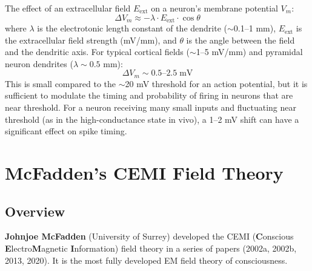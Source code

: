 \documentclass[11pt,a4paper]{report}
\begin{document}
\begin{mathbox}
\vspace{-6pt}
The effect of an extracellular field $E_{\text{ext}}$ on a neuron's membrane potential $V_m$:
\[
  \Delta V_m \approx -\lambda \cdot E_{\text{ext}} \cdot \cos\theta
\]
where $\lambda$ is the electrotonic length constant of the dendrite ($\sim$0.1--1 mm), $E_{\text{ext}}$ is the extracellular field strength (mV/mm), and $\theta$ is the angle between the field and the dendritic axis. For typical cortical fields ($\sim$1--5 mV/mm) and pyramidal neuron dendrites ($\lambda \sim 0.5$ mm):
\[
  \Delta V_m \sim 0.5\text{--}2.5\;\text{mV}
\]
This is small compared to the $\sim$20 mV threshold for an action potential, but it is sufficient to modulate the timing and probability of firing in neurons that are near threshold. For a neuron receiving many small inputs and fluctuating near threshold (as in the high-conductance state in vivo), a 1--2 mV shift can have a significant effect on spike timing.
\vspace{-4pt}
\end{mathbox}


\chapter{McFadden's CEMI Field Theory}

\section{Overview}

\textbf{Johnjoe McFadden} (University of Surrey) developed the CEMI (\textbf{C}onscious \textbf{E}lectro\textbf{M}agnetic \textbf{I}nformation) field theory in a series of papers (2002a, 2002b, 2013, 2020). It is the most fully developed EM field theory of consciousness.
\end{document}
